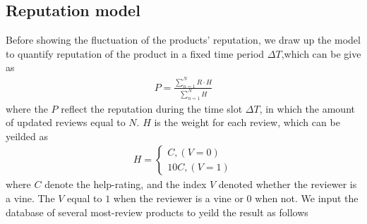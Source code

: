 \documentclass[12pt]{article}%
\begin{document}
\subsection{Reputation model}
Before showing the fluctuation of the products' reputation, we draw up the model to quantify reputation of the product in a fixed time period $\Delta T$,which can be give as
\begin{gather}
P=\frac{\sum_{n=1}^{N}R \cdot H}{\sum_{n=1}^{N} H}
\end{gather}
where the $P$ reflect the reputation during the time slot $\Delta T$, in which the amount of updated reviews equal to $N$. $H$ is the weight for each review, which can be yeilded as 
\begin{gather}
H=\left\{\begin{matrix}C ,(V=0)
\\ 10C,(V=1)
\end{matrix}\right.
\end{gather}
where $C$ denote the help-rating, and the index $V$ denoted whether the reviewer is a vine. The $V$ equal to $1$ when the reviewer is a vine or $0$ when not. We input the database of several most-review products to yeild the result as follows 
\end{document}
